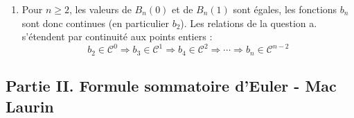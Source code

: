 \begin{enumerate}
\begin{enumerate}
  \item Pour $n\geq 2$, les valeurs de $B_n(0)$ et de $B_n(1)$ sont égales, les fonctions $b_n$ sont donc continues (en particulier $b_2$). Les relations de la question a. s'étendent par continuité aux points entiers :
\begin{displaymath}
  b_2 \in \mathcal{C}^0 \Rightarrow b_3\in \mathcal{C}^1 \Rightarrow b_4\in \mathcal{C}^2 \Rightarrow \cdots \Rightarrow b_n\in \mathcal{C}^{n-2}
\end{displaymath}
\end{enumerate}

\end{enumerate}

\subsection*{Partie II. Formule sommatoire d'Euler - Mac Laurin}
